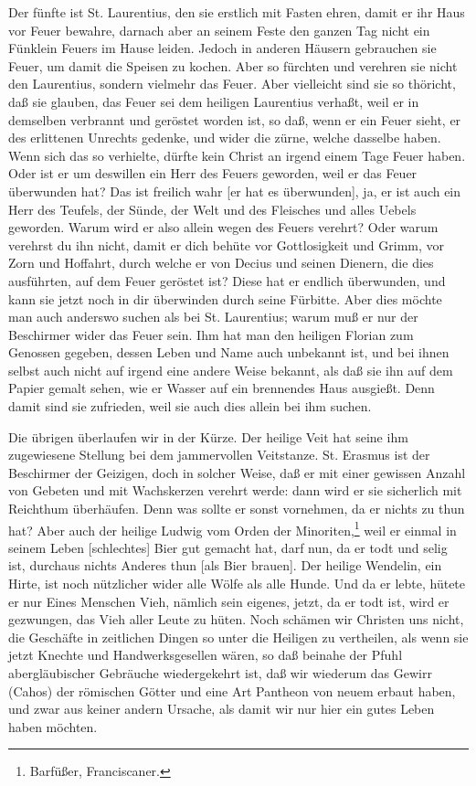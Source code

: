 Der fünfte ist St. Laurentius, den sie erstlich mit Fasten ehren, damit er ihr Haus vor Feuer bewahre, darnach aber an seinem Feste den ganzen Tag nicht ein Fünklein Feuers im Hause leiden. Jedoch in anderen Häusern gebrauchen sie Feuer, um damit die Speisen zu kochen. Aber so fürchten und verehren sie nicht den Laurentius, sondern vielmehr das Feuer. Aber vielleicht sind sie so thöricht, daß sie glauben, das Feuer sei dem heiligen Laurentius verhaßt, weil er in demselben verbrannt und geröstet worden ist, so daß, wenn er ein Feuer sieht, er des erlittenen Unrechts gedenke, und wider die zürne, welche dasselbe haben. Wenn sich das so verhielte, dürfte kein Christ an irgend einem Tage Feuer haben. Oder ist er um deswillen ein Herr des Feuers geworden, weil er das Feuer überwunden hat? Das ist freilich wahr [er hat es überwunden], ja, er ist auch ein Herr des Teufels, der Sünde, der Welt und des Fleisches und alles Uebels geworden. Warum wird er also allein wegen des Feuers verehrt? Oder warum verehrst du ihn nicht, damit er dich behüte vor Gottlosigkeit und Grimm, vor Zorn und Hoffahrt, durch welche er von Decius und seinen Dienern, die dies ausführten, auf dem Feuer geröstet ist? Diese hat er endlich überwunden, und kann sie jetzt noch in dir überwinden durch seine Fürbitte. Aber dies möchte man auch anderswo suchen als bei St. Laurentius; warum muß er nur der Beschirmer wider das Feuer sein. Ihm hat man den heiligen Florian zum Genossen gegeben, dessen Leben und Name auch unbekannt ist, und bei ihnen selbst auch nicht auf irgend eine andere Weise bekannt, als daß sie ihn auf dem Papier gemalt sehen, wie er Wasser auf ein brennendes Haus ausgießt. Denn damit sind sie zufrieden, weil sie auch dies allein bei ihm suchen.

Die übrigen überlaufen wir in der Kürze. Der heilige Veit hat seine ihm zugewiesene Stellung bei dem jammervollen Veitstanze. St. Erasmus ist der Beschirmer der Geizigen, doch in solcher Weise, daß er mit einer gewissen Anzahl von Gebeten und mit Wachskerzen verehrt werde: dann wird er sie sicherlich mit Reichthum überhäufen. Denn was sollte er sonst vornehmen, da er nichts zu thun hat? Aber auch der heilige Ludwig vom Orden der Minoriten,\footnote{Barfüßer, Franciscaner.} weil er einmal in seinem Leben [schlechtes] Bier gut gemacht hat, darf nun, da er todt und selig ist, durchaus nichts Anderes thun [als Bier brauen]. Der heilige Wendelin, ein Hirte, ist noch nützlicher wider alle Wölfe als alle Hunde. Und da er lebte, hütete er nur Eines Menschen Vieh, nämlich sein eigenes, jetzt, da er todt ist, wird er gezwungen, das Vieh aller Leute zu hüten. Noch schämen wir Christen uns nicht, die Geschäfte in zeitlichen Dingen so unter die Heiligen zu vertheilen, als wenn sie jetzt Knechte und Handwerksgesellen wären, so daß beinahe der Pfuhl abergläubischer Gebräuche wiedergekehrt ist, daß wir wiederum das Gewirr (Cahos) der römischen Götter und eine Art Pantheon von neuem erbaut haben, und zwar aus keiner andern Ursache, als damit wir nur hier ein gutes Leben haben möchten.

